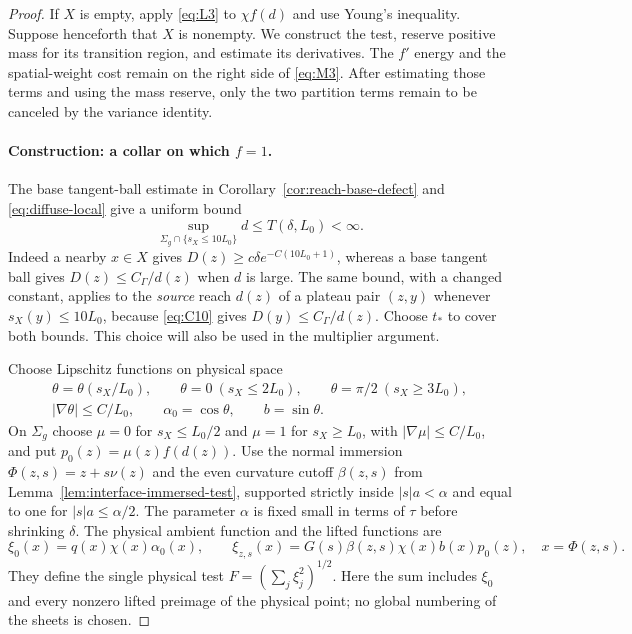 \begin{proof}
If $X$ is empty, apply \eqref{eq:L3} to $\chi f(d)$ and use Young's
inequality.  Suppose henceforth that $X$ is nonempty.  We construct the
test, reserve positive mass for its transition region, and estimate its
derivatives.  The $f'$ energy and the spatial-weight cost remain on the
right side of \eqref{eq:M3}.  After estimating those terms and using the
mass reserve, only the two partition terms remain to be canceled by
the variance identity.

\paragraph{Construction: a collar on which $f=1$.}
The base tangent-ball estimate in Corollary~\ref{cor:reach-base-defect}
and \eqref{eq:diffuse-local} give a uniform bound
\begin{equation}\label{eq:growth-bounded-collar-reach}
 \sup_{\Sigma_g\cap\{s_X\le10L_0\}}d\le T(\delta,L_0)<\infty.
\end{equation}
Indeed a nearby $x\in X$ gives
$D(z)\ge c\delta e^{-C(10L_0+1)}$, whereas a base tangent ball gives
$D(z)\le C_\Gamma/d(z)$ when $d$ is large.  The same bound, with a
changed constant, applies to the \emph{source} reach $d(z)$ of a
plateau pair $(z,y)$ whenever $s_X(y)\le10L_0$, because
\eqref{eq:C10} gives $D(y)\le C_\Gamma/d(z)$.  Choose $t_*$ to cover
both bounds.  This choice will also be used in the multiplier argument.

Choose Lipschitz functions on physical space
\[
 \begin{gathered}
 \theta=\theta(s_X/L_0),\qquad
 \theta=0\ (s_X\le2L_0),\qquad
 \theta=\pi/2\ (s_X\ge3L_0),\\
 |\nabla\theta|\le C/L_0,\qquad
 \alpha_0=\cos\theta,\qquad b=\sin\theta.
 \end{gathered}
\]
On $\Sigma_g$ choose $\mu=0$ for $s_X\le L_0/2$ and $\mu=1$ for
$s_X\ge L_0$, with $|\nabla\mu|\le C/L_0$, and put
$p_0(z)=\mu(z)f(d(z))$.  Use the normal immersion
$\Phi(z,s)=z+s\nu(z)$ and the even curvature cutoff $\beta(z,s)$ from
Lemma~\ref{lem:interface-immersed-test}, supported strictly inside
$|s|a<\alpha$ and equal to one for $|s|a\le\alpha/2$.  The parameter
$\alpha$ is fixed small in terms of $\tau$ before shrinking $\delta$.
The physical ambient function and the lifted functions are
\[
 \xi_0(x)=q(x)\chi(x)\alpha_0(x),\qquad
 \xi_{z,s}(x)=G(s)\beta(z,s)\chi(x)b(x)p_0(z),\quad x=\Phi(z,s).
\]
They define the single physical test $F=(\sum_j\xi_j^2)^{1/2}$.
Here the sum includes $\xi_0$ and every nonzero lifted preimage of the
physical point; no global numbering of the sheets is chosen.


\end{proof}

